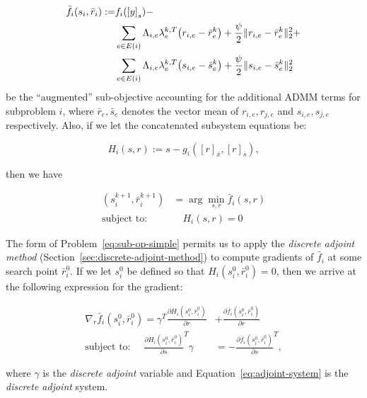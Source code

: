 \begin{align*}
\bar{f_i}\left(s_i,\bar{r}_i\right) := & f_i\left(\left[y\right]_{s}\right) - \\
        & \sum_{e \in E\left(i\right)}
        \Lambda_{i,e} \lambda^{k,T}_{e} \left(r_{i,e} - \bar{r}^{k}_{e} \right) +
        \frac{\augterm}{2} \|r_{i,e} - \bar{r}^{k}_{e}\|_2^2 + \\
        & \sum_{e \in E\left(i\right)}
        \Lambda_{i,e} \lambda^{k,T}_{e} \left(s_{i,e} - \bar{s}^{k}_{e} \right) +
        \frac{\augterm}{2} \|s_{i,e} - \bar{s}^{k}_{e}\|_2^2        
\end{align*}
be the ``augmented'' sub-objective accounting for the additional ADMM terms for subproblem $i$, where $\bar{r}_e,\bar{s}_e$ denotes the vector mean of $r_{i,e},r_{j,e}$ and $s_{i,e},s_{j,e}$ respectively. Also, if we let the concatenated subsystem equations be:

\[
H_i\left(s,r\right) :=s - g_i\left(\left[r\right]_{\bar{x}}, \left[r\right]_{\bar{s}} \right),
\]

then we have

\begin{align}
	\label{eq:sub-op-simple}
	\left(s^{k+1}_i, \bar{r}^{k+1}_i\right) & = \arg \min_{s,r} \bar{f}_i\left(s, r\right) \\ 
	\text{subject to:} & \quad H_i\left(s,r\right) = 0
\end{align}

The form of Problem~\eqref{eq:sub-op-simple} permits us to apply the \emph{discrete adjoint method} (Section~\ref{sec:discrete-adjoint-method}) to compute gradients of $\bar{f}_i$ at some search point $\bar{r}^0_i$. If we let $s^0_i$ be defined so that $H_i\left(s^0_i,\bar{r}_i^0\right) = 0$, then we arrive at the following expression for the gradient:

\begin{align}
	\label{eq:adjoint-grad-admm} \nabla_{r} \bar{f}_i\left(s^0_i,\bar{r}_i^0\right)  =  \gamma^T \frac{\partial H_i\left(s^0_i,\bar{r}_i^0\right)}{\partial r} & + \frac{\partial \bar{f}_i\left(s^0_i,\bar{r}_i^0\right)}{\partial r} \\ \text{subject to: } \quad \frac{\partial H_i\left(s^0_i,\bar{r}_i^0\right)}{\partial s}^T \gamma & = -\frac{\partial \bar{f}_i\left(s^0_i,\bar{r}_i^0\right)}{\partial s}^T, \label{eq:adjoint-system}
\end{align}

where $\gamma$ is the \emph{discrete adjoint} variable and Equation~\eqref{eq:adjoint-system} is the \emph{discrete adjoint} system.

